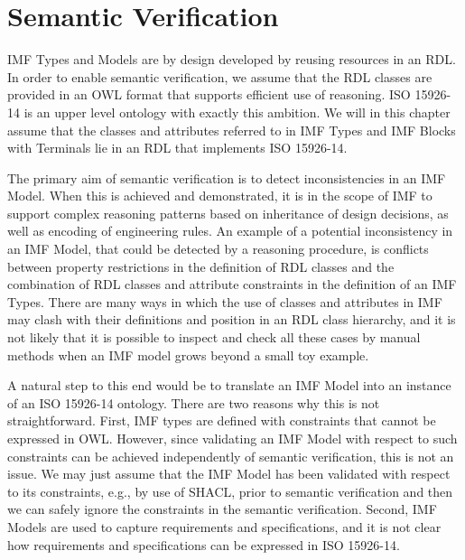 \chapter{Semantic Verification
 }\label{ch:Appendix E}
IMF Types and Models are by design developed by reusing resources in an RDL. In order to
enable semantic verification, we assume that the RDL classes are provided in an OWL format that supports efficient
use of reasoning. ISO 15926-14 is an upper level ontology with exactly this ambition. We will in this chapter assume
that the classes and attributes referred to in IMF Types and IMF Blocks with Terminals lie in an RDL that implements ISO
15926-14.

The primary aim of semantic verification is to detect inconsistencies in an IMF Model. When this is achieved and
demonstrated, it is in the scope of IMF to support complex reasoning patterns based on inheritance of design
decisions, as well as encoding of engineering rules. An example of a potential inconsistency in an IMF Model, that
could be detected by a reasoning procedure, is conflicts between property restrictions in the definition of RDL
classes and the combination of RDL classes and attribute constraints in the definition of an IMF Types. There are
many ways in which the use of classes and attributes in IMF may clash with their definitions and position in an RDL
class hierarchy, and it is not likely that it is possible to inspect and check all these cases by manual methods when
an IMF model grows beyond a small toy example.

A natural step to this end would be to translate an IMF Model into an instance of an ISO 15926-14 ontology. There are
two reasons why this is not straightforward. First, IMF types are defined with constraints that cannot be expressed
in OWL. However, since validating an IMF Model with respect to such constraints can be achieved independently of
semantic verification, this is not an issue. We may just assume that the IMF Model has been validated with respect to
its constraints, e.g., by use of SHACL, prior to semantic verification and then we can safely ignore the constraints
in the semantic verification. Second, IMF Models are used to capture requirements and specifications, and it is not
clear how requirements and specifications can be expressed in ISO 15926-14.

